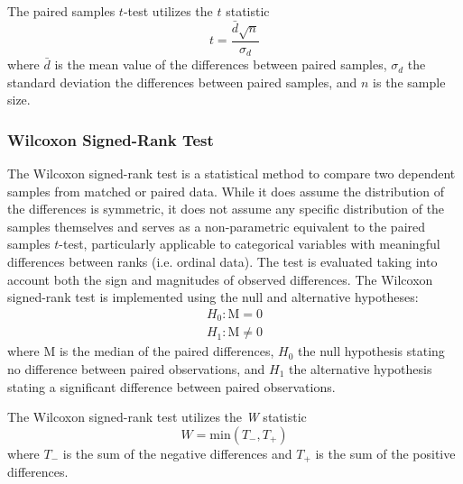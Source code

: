 The paired samples $t$-test utilizes the $t$ statistic
\begin{equation}
    t = \frac{\bar{d}\sqrt{n}}{\sigma_d}
\end{equation}
where $\bar{d}$ is the mean value of the differences between paired samples, $\sigma_d$ the standard deviation the differences between paired samples, and $n$ is the sample size.
     
\subsubsection{Wilcoxon Signed-Rank Test}
\hfill \break
The Wilcoxon signed-rank test is a statistical method to compare two dependent samples from matched or paired data. While it does assume the distribution of the differences is symmetric, it does not assume any specific distribution of the samples themselves and serves as a non-parametric equivalent to the paired samples $t$-test, particularly applicable to categorical variables with meaningful differences between ranks (i.e. ordinal data). The test is evaluated taking into account both the sign and magnitudes of observed differences. The Wilcoxon signed-rank test is implemented using the null and alternative hypotheses:
\begin{equation}
\begin{array}{c}
    H_0: \mathrm{M} = 0   \\
    H_1: \mathrm{M} \neq 0
\end{array}
\end{equation}
where M is the median of the paired differences, $H_0$ the null hypothesis stating no difference between paired observations, and $H_1$ the alternative hypothesis stating a significant difference between paired observations.

The Wilcoxon signed-rank test utilizes the \textit{W} statistic
\begin{equation}
     W = \mathrm{min}(T_-, T_+)
\end{equation}
where $T_-$ is the sum of the negative differences and $T_+$ is the sum of the positive differences.

